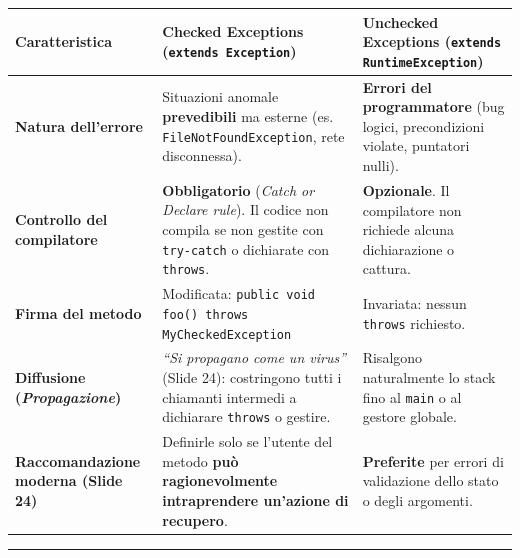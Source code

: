 \documentclass[11pt,a4paper]{article}
\newcommand{\passthrough}[1]{#1}
\begin{document}
\begin{longtable}[]{@{}
  >{\raggedright\arraybackslash}p{}
  >{\raggedright\arraybackslash}p{}
  >{\raggedright\arraybackslash}p{}@{}}
\toprule\noalign{}
\begin{minipage}[b]{\linewidth}\raggedright
Caratteristica
\end{minipage} & \begin{minipage}[b]{\linewidth}\raggedright
Checked Exceptions (\passthrough{\lstinline!extends Exception!})
\end{minipage} & \begin{minipage}[b]{\linewidth}\raggedright
Unchecked Exceptions
(\passthrough{\lstinline!extends RuntimeException!})
\end{minipage} \\
\midrule\noalign{}
\endhead
\bottomrule\noalign{}
\endlastfoot
\textbf{Natura dell'errore} & Situazioni anomale \textbf{prevedibili} ma
esterne (es. \passthrough{\lstinline!FileNotFoundException!}, rete
disconnessa). & \textbf{Errori del programmatore} (bug logici,
precondizioni violate, puntatori nulli). \\
\textbf{Controllo del compilatore} & \textbf{Obbligatorio} (\emph{Catch
or Declare rule}). Il codice non compila se non gestite con
\passthrough{\lstinline!try-catch!} o dichiarate con
\passthrough{\lstinline!throws!}. & \textbf{Opzionale}. Il compilatore
non richiede alcuna dichiarazione o cattura. \\
\textbf{Firma del metodo} & Modificata:
\passthrough{\lstinline!public void foo() throws MyCheckedException!} &
Invariata: nessun \passthrough{\lstinline!throws!} richiesto. \\
\textbf{Diffusione (\emph{Propagazione})} & \emph{``Si propagano come un
virus''} (Slide 24): costringono tutti i chiamanti intermedi a
dichiarare \passthrough{\lstinline!throws!} o gestire. & Risalgono
naturalmente lo stack fino al \passthrough{\lstinline!main!} o al
gestore globale. \\
\textbf{Raccomandazione moderna (Slide 24)} & Definirle solo se l'utente
del metodo \textbf{può ragionevolmente intraprendere un'azione di
recupero}. & \textbf{Preferite} per errori di validazione dello stato o
degli argomenti. \\
\end{longtable}

\begin{center}\rule{0.5\linewidth}{0.5pt}\end{center}
\end{document}
